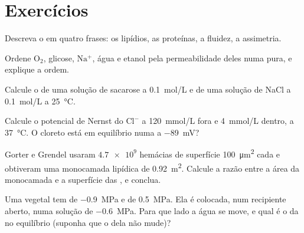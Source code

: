 \section{Exercícios}

\begin{exercise}[$\star$]\label{exo:b1:membranes-transport:1}
Descreva o  em quatro frases: os lipídios, as
proteínas, a fluidez, a assimetria.
\end{exercise}

\begin{exercise}[$\star$]\label{exo:b1:membranes-transport:2}
Ordene $\mathrm{O_2}$, glicose, $\mathrm{Na^+}$, água e etanol pela
permeabilidade deles numa  pura, e explique a ordem.
\end{exercise}

\begin{exercise}[$\star$]\label{exo:b1:membranes-transport:3}
Calcule o  de uma solução de sacarose a
\qty{0.1}{mol/L} e de uma solução de NaCl a \qty{0.1}{mol/L} a
\qty{25}{\celsius}.
\end{exercise}

\begin{exercise}[$\star$]\label{exo:b1:membranes-transport:4}
Calcule o potencial de Nernst do $\mathrm{Cl^-}$ a \qty{120}{mmol/L}
fora e \qty{4}{mmol/L} dentro, a \qty{37}{\celsius}. O cloreto está em
equilíbrio numa  a \qty{-89}{mV}?
\end{exercise}

\begin{exercise}[$\star\star$]\label{exo:b1:membranes-transport:5}
Gorter e Grendel usaram $\num{4.7e9}$ hemácias de superfície
\qty{100}{\micro m^2} cada e obtiveram uma monocamada lipídica de
\qty{0.92}{m^2}. Calcule a razão entre a área da monocamada e a
superfície das , e conclua.
\end{exercise}

\begin{exercise}[$\star\star$]\label{exo:b1:membranes-transport:6}
Uma  vegetal tem  de \qty{-0.9}{MPa} e  de \qty{0.5}{MPa}. Ela é colocada, num recipiente aberto, numa
solução de  \qty{-0.6}{MPa}. Para que lado a água se
move, e qual é o  da  no equilíbrio (suponha
que o  dela não mude)?
\end{exercise}

